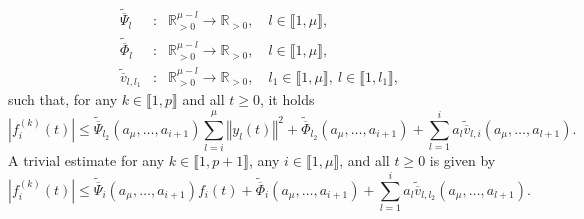 \documentclass[letterpaper, 10pt]{article}
\newcommand{\norme}[1]{\left\Vert #1\right\Vert}
\newcommand{\abs}[1]{\left| #1 \right|}
\newcommand{\reels}{\mathbb{R}}
\begin{document}
\begin{eqnarray*}
\tilde{\overline{\Psi}}_{l} & : & \reels^{\mu - l}_{>0} \rightarrow \reels_{>0}, \quad l \in \llbracket 1 , \mu  \rrbracket ,\\
 \tilde{\overline{\Phi}}_{l} & : & \reels^{\mu - l}_{>0} \rightarrow \reels_{>0}, \quad l \in \llbracket 1 , \mu  \rrbracket ,\\
 \tilde{\overline{v}}_{l,l_1}  &:& \reels^{\mu - l}_{>0} \rightarrow \reels_{>0}, \quad l_1 \in \llbracket 1 , \mu  \rrbracket, \: l \in \llbracket 1 , l_1  \rrbracket ,
\end{eqnarray*} such that, for any $k \in \llbracket 1, p  \rrbracket $ and all $t \geq 0$, it holds
\begin{equation*}
\abs{f^{(k)}_i (t) } \leq  \tilde{\overline{\Psi}}_{l_2} (a_\mu , \ldots , a_{i +1})  \sum\limits_{l  =i}^{\mu }  \norme{y_l(t)}^2  +  \tilde{\overline{\Phi}}_{l_2}(a_\mu , \ldots , a_{i +1}) +   \sum\limits_{l  =1}^{i}  a_l \tilde{\overline{v}}_{l,i} (a_\mu , \ldots , a_{l+1}).
\end{equation*} 
A trivial estimate for any $k \in \llbracket 1 , p+1 \rrbracket $, any $i \in \llbracket 1 , \mu  \rrbracket $, and all $t\geq 0$ is given by
\begin{equation}
\label{est:f_i_k}
\abs{f^{(k)}_i (t) } \leq   \tilde{\overline{\Psi}}_{i} (a_\mu , \ldots , a_{i +1})  f_{i}(t)  +  \tilde{\overline{\Phi}}_{i}(a_\mu , \ldots , a_{i +1}) +   \sum\limits_{l  =1}^{i}  a_l \tilde{\overline{v}}_{l,l_2} (a_\mu , \ldots , a_{l+1}) .
\end{equation}
\end{document}

